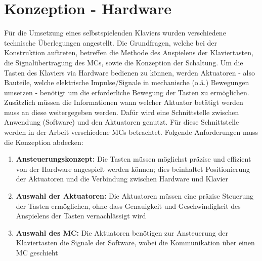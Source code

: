 
\graphicspath{ {./img/} }

\chapter{Konzeption - Hardware}\label{konzeptionHW}


Für die Umsetzung eines selbstspielenden Klaviers wurden verschiedene technische Überlegungen angestellt.
Die Grundfragen, welche bei der Konstruktion auftreten, betreffen die Methode des Anspielens der Klaviertasten, die
Signalübertragung des \ac{MC}s, sowie die Konzeption der Schaltung. \newline
Um die Tasten des Klaviers via Hardware bedienen zu können, werden Aktuatoren - also Bauteile, welche elektrische
Impulse/Signale in mechanische (o.ä.) Bewegungen umsetzen - benötigt um die erforderliche Bewegung der Tasten zu ermöglichen.
Zusätzlich müssen die Informationen wann welcher Aktuator betätigt werden muss an diese weitergegeben werden.
Dafür wird eine Schnittstelle zwischen Anwendung (Software) und den Aktuatoren genutzt. Für diese Schnittstelle werden
in der Arbeit verschiedene \ac{MC}s betrachtet.\newline
Folgende Anforderungen muss die Konzeption abdecken:
\begin{enumerate}
	\item \textbf{Ansteuerungskonzept:} Die Tasten müssen möglichst präzise und effizient von der Hardware angespielt werden können; dies beinhaltet Positionierung der Aktuatoren und die Verbindung zwischen Hardware und Klavier
	\item \textbf{Auswahl der Aktuatoren:} Die Aktuatoren müssen eine präzise Steuerung der Tasten ermöglichen, ohne dass Genauigkeit und Geschwindigkeit des Anspielens der Tasten vernachlässigt wird
	\item \textbf{Auswahl des \ac{MC}:} Die Aktuatoren benötigen zur Ansteuerung der Klaviertasten die Signale der Software, wobei die Kommunikation über einen \ac{MC} geschieht
\end{enumerate}

